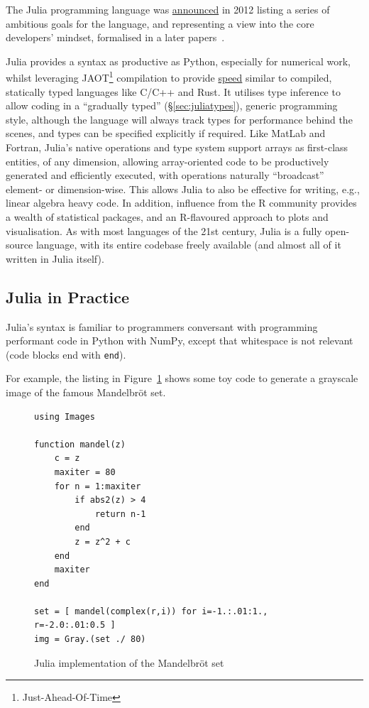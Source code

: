 \documentclass{webofc}
\begin{document}
The Julia programming language was
\href{https://julialang.org/blog/2012/02/why-we-created-julia/}{announced} in 2012
listing a series of ambitious goals for the language, and representing
a view into the core developers' mindset, formalised in a later
papers~\cite{bib:julia_freshapproach,10.1145/3276490}.

Julia provides a syntax as productive as Python, especially for numerical work,
whilst leveraging JAOT\footnote{Just-Ahead-Of-Time} compilation to provide
\href{https://julialang.org/benchmarks/}{speed} similar to compiled, statically
typed languages like C/C++ and Rust. It utilises type inference to allow coding in a
``gradually typed'' (\S\ref{sec:juliatypes}), generic programming style, although the language will
always track types for performance behind the scenes, and types can be specified
explicitly if required. Like MatLab and Fortran, Julia's native operations and
type system support arrays as first-class entities, of any dimension, allowing
array-oriented code to be productively generated and efficiently executed, with
operations naturally ``broadcast'' element- or dimension-wise. This allows Julia
to also be effective for writing, e.g., linear algebra heavy code. In addition,
influence from the R community provides a wealth of statistical packages, and an
R-flavoured approach to plots and visualisation. As with most languages of the
21st century, Julia is a fully open-source language, with its entire codebase
freely available (and almost all of it written in Julia itself).

\subsection{Julia in Practice}
\label{sec:juliainpractice}

Julia's syntax is familiar to programmers conversant with programming performant
code in Python with NumPy, except that whitespace is not relevant
(code blocks end with \texttt{end}).

For example, the listing in Figure~\ref{code:madelbrot} shows some toy code to
generate a grayscale image of the famous Mandelbröt set.

\begin{figure}[!ht]
\centering
\begin{verbatim}
using Images

function mandel(z)
    c = z
    maxiter = 80
    for n = 1:maxiter
        if abs2(z) > 4
            return n-1
        end
        z = z^2 + c
    end
    maxiter
end

set = [ mandel(complex(r,i)) for i=-1.:.01:1., r=-2.0:.01:0.5 ]
img = Gray.(set ./ 80)
\end{verbatim}
\caption{Julia implementation of the Mandelbr\"{o}t set}
\label{code:madelbrot}
\end{figure}
\end{document}
